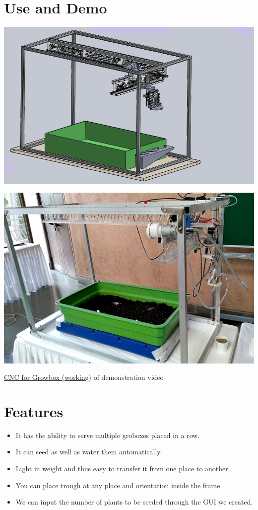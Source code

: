 \documentclass[a4paper,12pt,oneside]{book}
\begin{document}
\section{Use and Demo}
	\begin{center}
		\includegraphics[scale=.6]{design.png}
	\end{center}
	\begin{center}
		\includegraphics[scale=.5]{growbox_image.jpg}
	\end{center}

\href{https://youtu.be/hDnJ0aEMh-A}{CNC for Growbox (working)} of demonstration video 

\section{Features}
\begin{itemize}
    \item It has the ability to serve multiple groboxes placed in a row.
    \item It can seed as well as water them automatically.
    \item Light in weight and thus easy to transfer it from one place to another.
    \item You can place trough at any place and orientation inside the frame.
    \item We can input the number of plants to be seeded through the GUI we created.
\end{itemize}
\end{document}
